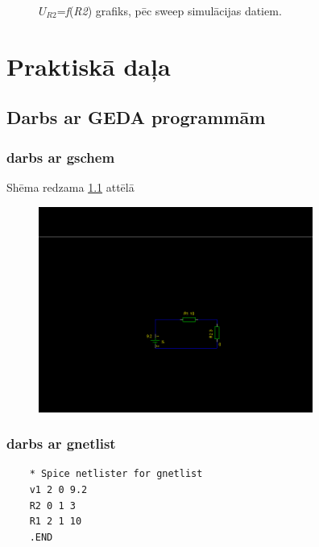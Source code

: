 \documentclass{report}
\begin{document}
\begin{figure}
\begin{center}
\caption{$U_{R2}$=\textit{f}(\textit{R2}) grafiks, pēc sweep simulācijas datiem.}\label{graph:1}
\end{center}
\end{figure}


\chapter {Praktiskā daļa}
\section {Darbs ar GEDA programmām}
\subsection{darbs ar gschem \cite{gschem}}
Shēma redzama \ref{att:1} attēlā

\begin{figure}[b!]
\centering
\includegraphics[width=9cm]{01.png}
\label{att:1}
\end{figure}

\newpage
\subsection{darbs ar gnetlist}
\begin{verbatim}
    * Spice netlister for gnetlist
    v1 2 0 9.2
    R2 0 1 3
    R1 2 1 10
    .END
\end{verbatim}
\end{document}

